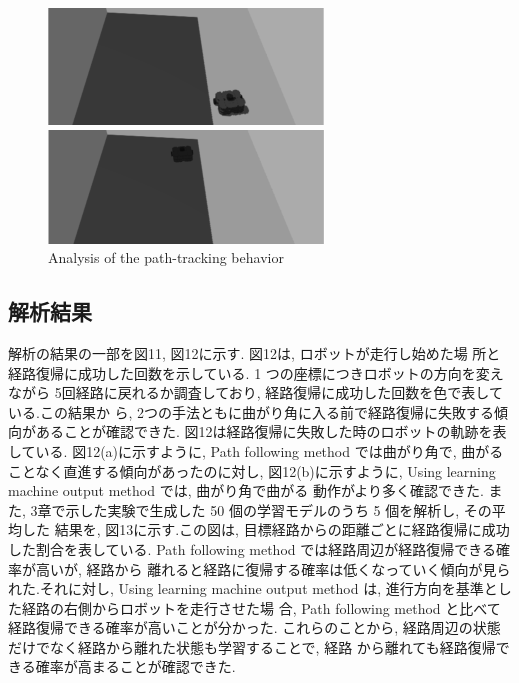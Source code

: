 \documentclass{jarticle}
\begin{document}
\begin{figure}[htbp]
  \begin{minipage}[t]{0.5\linewidth}
    \centering
    \includegraphics[keepaspectratio, scale=0.32]{figs/init4.png}
  \end{minipage}
  \begin{minipage}[t]{0.5\linewidth}
    \centering
    \includegraphics[keepaspectratio, scale=0.33]{figs/return3.png}
  \end{minipage}\vspace*{4mm}
  \caption{Analysis of the path-tracking behavior}
\end{figure}


\subsection{解析結果}
解析の結果の一部を図11, 図12に示す. 図12は, ロボットが走行し始めた場
所と経路復帰に成功した回数を示している. 1 つの座標につきロボットの方向を変えながら
5回経路に戻れるか調査しており, 経路復帰に成功した回数を色で表している.この結果か
ら, 2つの手法ともに曲がり角に入る前で経路復帰に失敗する傾向があることが確認できた.
図12は経路復帰に失敗した時のロボットの軌跡を表している. 図12(a)に示すように,
Path following method では曲がり角で, 曲がることなく直進する傾向があったのに対し, 
図12(b)に示すように, Using learning machine output method では, 曲がり角で曲がる
動作がより多く確認できた.
また, 3章で示した実験で生成した 50 個の学習モデルのうち 5 個を解析し, その平均した
結果を, 図13に示す.この図は, 目標経路からの距離ごとに経路復帰に成功した割合を表している. 
Path following method では経路周辺が経路復帰できる確率が高いが, 経路から
離れると経路に復帰する確率は低くなっていく傾向が見られた.それに対し, Using learning
machine output method は, 進行方向を基準とした経路の右側からロボットを走行させた場
合, Path following method と比べて経路復帰できる確率が高いことが分かった.
これらのことから, 経路周辺の状態だけでなく経路から離れた状態も学習することで, 経路
から離れても経路復帰できる確率が高まることが確認できた.
\end{document}
